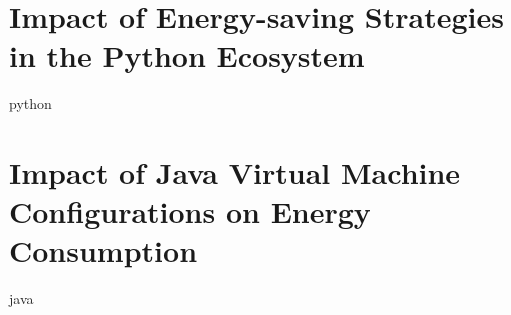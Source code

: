 % 

\chapter{Impact of Energy-saving Strategies in the Python Ecosystem}
\label{chapter:python}
{python}

\chapter{Impact of Java Virtual Machine Configurations on Energy Consumption}
\label{chapter:java}
{java}